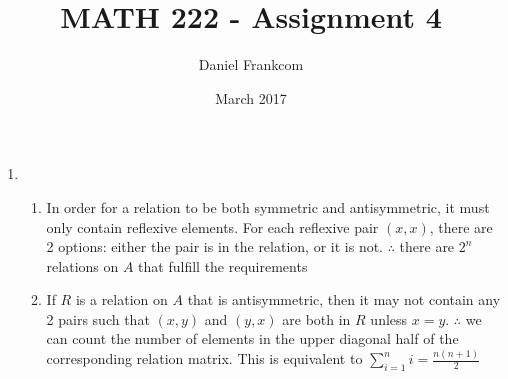 \documentclass{article}
\title{MATH 222 - Assignment 4}
\date{March 2017}
\author{Daniel Frankcom}
\begin{document}
	\maketitle
	\setlength{\parindent}{0pt}
	\newcommand{\forceindent}{\leavevmode{\parindent=72pt\indent}}
	\newpage
	
	\begin{enumerate}
		
		\item 
		\begin{enumerate}
			\item In order for a relation to be both symmetric and antisymmetric, it must only contain reflexive elements. For each reflexive pair $(x,x)$, there are 2 options: either the pair is in the relation, or it is not.
			\newline $\therefore$ there are $2^n$ relations on $A$ that fulfill the requirements
			\item If $R$ is a relation on $A$ that is antisymmetric, then it may not contain any 2 pairs such that $(x,y)$ and $(y,x)$ are both in $R$ unless $x=y$.
			\newline $\therefore$ we can count the number of elements in the upper diagonal half of the corresponding relation matrix.
			\newline This is equivalent to $\sum\limits_{i=1}^{n}i=\frac{n(n+1)}{2}$
		\end{enumerate}
	
	\end{enumerate}
\end{document}
